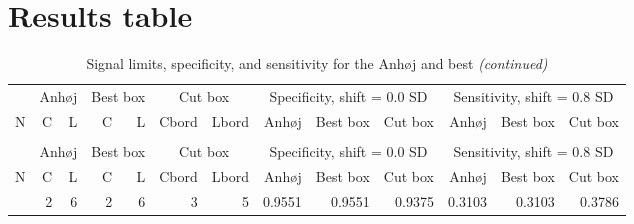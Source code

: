 

\newpage

\hypertarget{results-table}{%
\section{Results table}\label{results-table}}

\scriptsize

\begin{Schunk}

\begin{longtable}{rrrrrrrrrrrrr}
\caption{\label{tab:tab1}Signal limits, specificity, and sensitivity for the Anhøj and best box
        rules and borders for the cut box rules. N = number of data points in
        chart.
        C = lower limit for number of crossings, L = upper limit for longest 
        run,  for declaring random variation by the Anhøj and best box rules. 
        Cbord and Lbord = Additional information for the cut box rules. When
        specified, parts of the border of the best box to retain to declare
        random variation. When not specified, cut box is identical to best box.}\\
\toprule
\multicolumn{1}{c}{ } & \multicolumn{2}{c}{Anhøj} & \multicolumn{2}{c}{Best box} & \multicolumn{2}{c}{Cut box} & \multicolumn{3}{c}{Specificity, shift = 0.0 SD} & \multicolumn{3}{c}{Sensitivity, shift = 0.8 SD} \\
\cmidrule(l{3pt}r{3pt}){2-3} \cmidrule(l{3pt}r{3pt}){4-5} \cmidrule(l{3pt}r{3pt}){6-7} \cmidrule(l{3pt}r{3pt}){8-10} \cmidrule(l{3pt}r{3pt}){11-13}
N & C & L & C & L & Cbord & Lbord & Anhøj & Best box & Cut box & Anhøj & Best box & Cut box\\
\midrule
\endfirsthead
\caption[]{Signal limits, specificity, and sensitivity for the Anhøj and best  \textit{(continued)}}\\
\toprule
\multicolumn{1}{c}{ } & \multicolumn{2}{c}{Anhøj} & \multicolumn{2}{c}{Best box} & \multicolumn{2}{c}{Cut box} & \multicolumn{3}{c}{Specificity, shift = 0.0 SD} & \multicolumn{3}{c}{Sensitivity, shift = 0.8 SD} \\
\cmidrule(l{3pt}r{3pt}){2-3} \cmidrule(l{3pt}r{3pt}){4-5} \cmidrule(l{3pt}r{3pt}){6-7} \cmidrule(l{3pt}r{3pt}){8-10} \cmidrule(l{3pt}r{3pt}){11-13}
N & C & L & C & L & Cbord & Lbord & Anhøj & Best box & Cut box & Anhøj & Best box & Cut box\\
\midrule
\endhead
\
\endfoot
\bottomrule
\endlastfoot
10 & 2 & 6 & 2 & 6 & 3 & 5 & 0.9551 & 0.9551 & 0.9375 & 0.3103 & 0.3103 & 0.3786\\

\end{longtable}
\end{Schunk}

